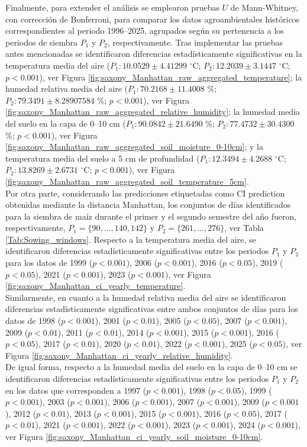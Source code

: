 Finalmente, para extender el análisis se emplearon pruebas $U$ de Mann-Whitney, con corrección de Bonferroni, para comparar los datos agroambientales históricos correspondientes al periodo 1996--2025, agrupados según su pertenencia a los periodos de siembra $P_1$ y $P_2$, respectivamente.  Tras implementar las pruebas antes mencionadas se identificaron diferencias estadísticamente significativas en la temperatura media del aire ($P_1:	10.0529	\pm	4.41299	$ $^\circ$C; 	$P_2:	12.2039	\pm	3.1447	$ $^\circ$C; 	$p<0.001$), ver Figura \ref{fig:saxony_Manhattan_raw_aggregated_temperature}; la humedad relativa media del aire ($P_1:	70.2168	\pm	11.4008	$ \%; 	$P_2:	79.3491	\pm	8.28907584	$ \%; 	$p<0.001$), ver Figura \ref{fig:saxony_Manhattan_raw_aggregated_relative_humidity}; la humedad media del suelo en la capa de 0--10 cm  ($P_1:	90.0842	\pm	21.6490	$ \%; 	$P_2:	77.4732	\pm	30.4300	$ \%; 	$p<0.001$),
ver Figura \ref{fig:saxony_Manhattan_raw_aggregated_soil_moisture_0-10cm}; y la temperatura media del suelo a 5 cm de profundidad ($P_1:	12.3494	\pm	4.2688	$ $^\circ$C; 	$P_2:	13.8269	\pm	2.6731	$ $^\circ$C; 	$p<0.001$), ver Figura \ref{fig:saxony_Manhattan_raw_aggregated_soil_temperature_5cm}.\\

Por otra parte, considerando las predicciones etiquetadas como CI prediction obtenidas mediante la distancia Manhattan, los conjuntos de días identificados para la siembra de maíz durante el primer y el segundo semestre del año fueron, respectivamente, $P_1=\{90,\ldots,140,142\}$ y $P_2=\{261,\ldots,276\}$, ver Tabla \ref{Tab:Sowing_windows}. Respecto a la temperatura media del aire, se identificaron diferencias estadísticamente significativas entre los periodos $P_1$ y $P_2$ para los datos de 1999	($p<0.001$), 2006	($p<0.001$), 2016	($p<0.05$), 2019	($p<0.05$), 2021	($p<0.001$), 2023	($p<0.001$), ver Figura \ref{fig:saxony_Manhattan_ci_yearly_temperature}.\\

Similarmente, en cuanto a la humedad relativa media del aire se identificaron diferencias estadísticamente significativas entre ambos conjuntos de días para los datos de 1998	($p<0.001$), 2001	($p<0.01$), 2005	($p<0.05$), 2007	($p<0.001$), 2009	($p<0.01$), 2011	($p<0.01$), 2014	($p<0.001$), 2015	($p<0.001$), 2016	($p<0.05$), 2017	($p<0.01$), 2020	($p<0.01$), 2022	($p<0.001$), 2025	($p<0.05$), ver Figura \ref{fig:saxony_Manhattan_ci_yearly_relative_humidity}.\\


De igual forma, respecto a la humedad media del suelo en la capa de 0--10 cm se identificaron diferencias estadísticamente significativas entre los periodos $P_1$ y $P_2$ en los datos que corresponden a 1997	($p<0.001$), 1998	($p<0.05$), 1999	($p<0.001$), 2003	($p<0.001$), 2006	($p<0.001$), 2007	($p<0.001$), 2009	($p<0.001$), 2012	($p<0.01$), 2013	($p<0.001$), 2015	($p<0.001$), 2016	($p<0.05$), 2017	($p<0.01$), 2021	($p<0.001$), 2022	($p<0.001$), 2023	($p<0.001$), 2024	($p<0.001$), ver Figura \ref{fig:saxony_Manhattan_ci_yearly_soil_moisture_0-10cm}.\\

